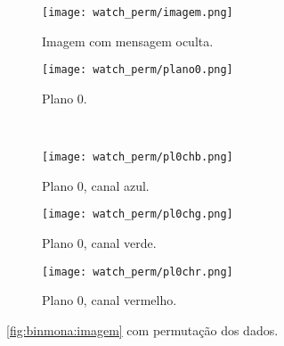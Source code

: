 \begin{figure}[H]
    \centering
    \begin{subfigure}{0.4\textwidth}
        \centering
        \texttt{[image: watch\_perm/imagem.png]}
        \caption{Imagem com mensagem oculta.}
        \label{fig:permbin:imagem}
    \end{subfigure}%
    \begin{subfigure}{0.4\textwidth}
        \centering
        \texttt{[image: watch\_perm/plano0.png]}
        \caption{Plano 0.}
        \label{fig:permbin:plano}
    \end{subfigure}\\[8pt]
    \begin{subfigure}{0.28\textwidth}
        \centering
        \texttt{[image: watch\_perm/pl0chb.png]}
        \caption{Plano 0, canal azul.}
        \label{fig:permbin:blue}
    \end{subfigure}%
    \begin{subfigure}{0.28\textwidth}
        \centering
        \texttt{[image: watch\_perm/pl0chg.png]}
        \caption{Plano 0, canal verde.}
        \label{fig:permbin:green}
    \end{subfigure}%
    \begin{subfigure}{0.28\textwidth}
        \centering
        \texttt{[image: watch\_perm/pl0chr.png]}
        \caption{Plano 0, canal vermelho.}
        \label{fig:permbin:red}
    \end{subfigure}%

    \caption{\cref{fig:binmona:imagem} com permutação dos dados.}
    \label{fig:permbin}
\end{figure}
